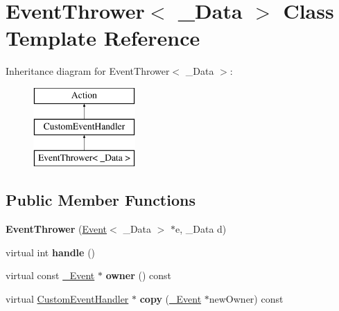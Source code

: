 \hypertarget{class_event_thrower}{
\section{EventThrower$<$ \_\-Data $>$ Class Template Reference}
\label{class_event_thrower}
}
Inheritance diagram for EventThrower$<$ \_\-Data $>$:\begin{figure}[H]
\begin{center}
\leavevmode
\includegraphics[height=3cm]{class_event_thrower}
\end{center}
\end{figure}
\subsection*{Public Member Functions}
\begin{DoxyCompactItemize}
\item 
\hypertarget{class_event_thrower_a315a551594b944d1138c5a322b7494fa}{
{\bfseries EventThrower} (\hyperlink{class_event}{Event}$<$ \_\-Data $>$ $\ast$e, \_\-Data d)}
\label{class_event_thrower_a315a551594b944d1138c5a322b7494fa}

\item 
\hypertarget{class_event_thrower_a891d5202b8637a50fa8d19c01a3ceeab}{
virtual int {\bfseries handle} ()}
\label{class_event_thrower_a891d5202b8637a50fa8d19c01a3ceeab}

\item 
\hypertarget{class_event_thrower_a4517309f046862852e55f15e284cb49f}{
virtual const \hyperlink{class___event}{\_\-Event} $\ast$ {\bfseries owner} () const }
\label{class_event_thrower_a4517309f046862852e55f15e284cb49f}

\item 
\hypertarget{class_event_thrower_a69ee74f14bc49b83346d8f41748d561d}{
virtual \hyperlink{class_custom_event_handler}{CustomEventHandler} $\ast$ {\bfseries copy} (\hyperlink{class___event}{\_\-Event} $\ast$newOwner) const }
\label{class_event_thrower_a69ee74f14bc49b83346d8f41748d561d}

\end{DoxyCompactItemize}
